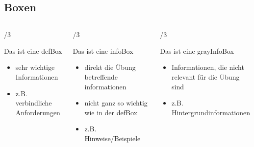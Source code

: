 \documentclass[
    ngerman,
    accentcolor=3b,
    dark_mode,
    fontsize= 12pt,
    a4paper,
    aspectratio=169,
    colorback=true,
    fancy_row_colors,
    leqno,
    fleqn,
    boxarc=3pt,
    fleqn,
]{algoslides}
\begin{document}
    \subsection{Boxen}
    \begin{frame}
        \slidehead{}
        \begin{columns}[c]
            \begin{column}[t]{\textwidth/3}
                \begin{defBox}
                    Das ist eine defBox
                \end{defBox}
                \begin{itemize}
                    \item sehr wichtige Informationen
                    \item z.B. verbindliche Anforderungen
                \end{itemize}
            \end{column}%
            \begin{column}[t]{\textwidth/3}
                \begin{infoBox}
                    Das ist eine infoBox
                \end{infoBox}
                \begin{itemize}
                    \item direkt die Übung betreffende informationen
                    \item nicht ganz so wichtig wie in der defBox
                    \item z.B. Hinweise/Beispiele
                \end{itemize}
            \end{column}%
            \begin{column}[t]{\textwidth/3}
                \begin{grayInfoBox}
                    Das ist eine grayInfoBox
                \end{grayInfoBox}
                \begin{itemize}
                    \item Informationen, die nicht relevant für die Übung sind
                    \item z.B. Hintergrundinformationen
                \end{itemize}
            \end{column}%
        \end{columns}
    \end{frame}
\end{document}
